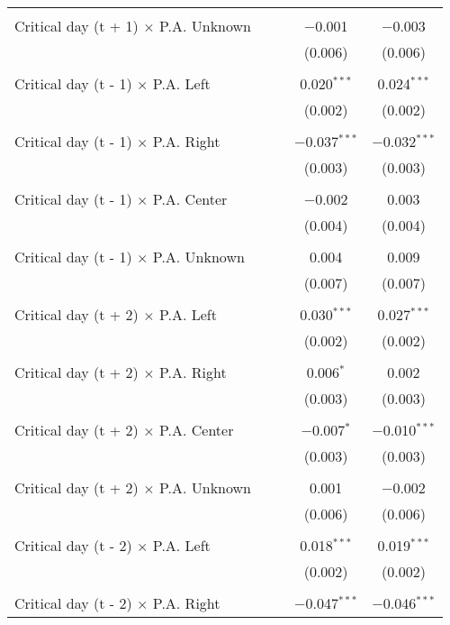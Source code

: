 \documentclass[
]{article}
\begin{document}
\begin{table}[!htbp]
{\begin{tabular}{@{\extracolsep{5pt}}lcccc}
  & & & & \\ 
 Critical day (t + 1) $\times$ P.A. Unknown &  &  & $-$0.001 & $-$0.003 \\ 
  &  &  & (0.006) & (0.006) \\ 
  & & & & \\ 
 Critical day (t - 1) $\times$ P.A. Left &  &  & 0.020$^{***}$ & 0.024$^{***}$ \\ 
  &  &  & (0.002) & (0.002) \\ 
  & & & & \\ 
 Critical day (t - 1) $\times$ P.A. Right &  &  & $-$0.037$^{***}$ & $-$0.032$^{***}$ \\ 
  &  &  & (0.003) & (0.003) \\ 
  & & & & \\ 
 Critical day (t - 1) $\times$ P.A. Center &  &  & $-$0.002 & 0.003 \\ 
  &  &  & (0.004) & (0.004) \\ 
  & & & & \\ 
 Critical day (t - 1) $\times$ P.A. Unknown &  &  & 0.004 & 0.009 \\ 
  &  &  & (0.007) & (0.007) \\ 
  & & & & \\ 
 Critical day (t + 2) $\times$ P.A. Left &  &  & 0.030$^{***}$ & 0.027$^{***}$ \\ 
  &  &  & (0.002) & (0.002) \\ 
  & & & & \\ 
 Critical day (t + 2) $\times$ P.A. Right &  &  & 0.006$^{*}$ & 0.002 \\ 
  &  &  & (0.003) & (0.003) \\ 
  & & & & \\ 
 Critical day (t + 2) $\times$ P.A. Center &  &  & $-$0.007$^{*}$ & $-$0.010$^{***}$ \\ 
  &  &  & (0.003) & (0.003) \\ 
  & & & & \\ 
 Critical day (t + 2) $\times$ P.A. Unknown &  &  & 0.001 & $-$0.002 \\ 
  &  &  & (0.006) & (0.006) \\ 
  & & & & \\ 
 Critical day (t - 2) $\times$ P.A. Left &  &  & 0.018$^{***}$ & 0.019$^{***}$ \\ 
  &  &  & (0.002) & (0.002) \\ 
  & & & & \\ 
 Critical day (t - 2) $\times$ P.A. Right &  &  & $-$0.047$^{***}$ & $-$0.046$^{***}$ \\ 

\end{tabular}}
\end{table}
\end{document}
